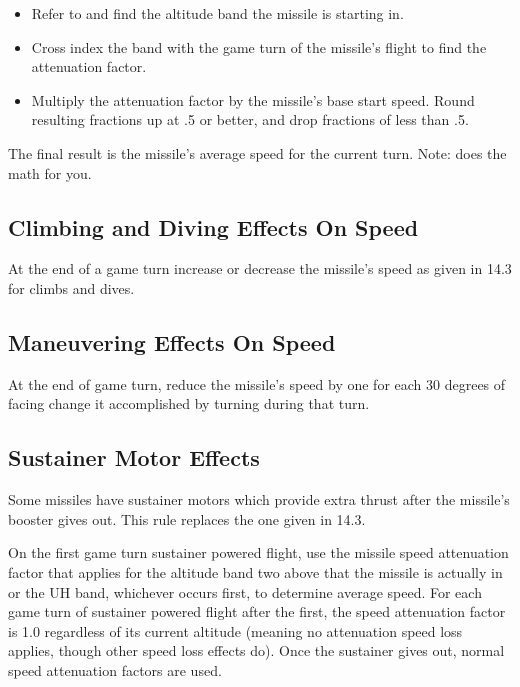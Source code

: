 \begin{advancedrules}
    \begin{itemize}

        \item Refer to  and find the altitude band the missile is starting in.

        \item Cross index the band with the game turn of the missile's flight to find the attenuation factor.

        \item Multiply the attenuation factor by the missile's base start speed. Round resulting fractions up at .5 or better, and drop fractions of less than .5.

    \end{itemize}

    The final result is the missile's average speed for the current turn. Note:  does the math for you.

    \subsection{Climbing and Diving Effects On Speed} At the end of a game turn increase or decrease the missile's speed as given in 14.3 for climbs and dives.

    \subsection{Maneuvering Effects On Speed} At the end of game turn, reduce the missile's speed by one for each 30 degrees of facing change it accomplished by turning during that turn.

    \subsection{Sustainer Motor Effects} Some missiles have sustainer motors which provide extra thrust after the missile's booster gives out. This rule replaces the one given in 14.3.

    On the first game turn sustainer powered flight, use the missile speed attenuation factor that applies for the altitude band two above that the missile is actually in or the UH band, whichever occurs first, to determine average speed. For each game turn of sustainer powered flight after the first, the speed attenuation factor is 1.0 regardless of its current altitude (meaning no attenuation speed loss applies, though other speed loss effects do). Once the sustainer gives out, normal speed attenuation factors are used.


\end{advancedrules}
